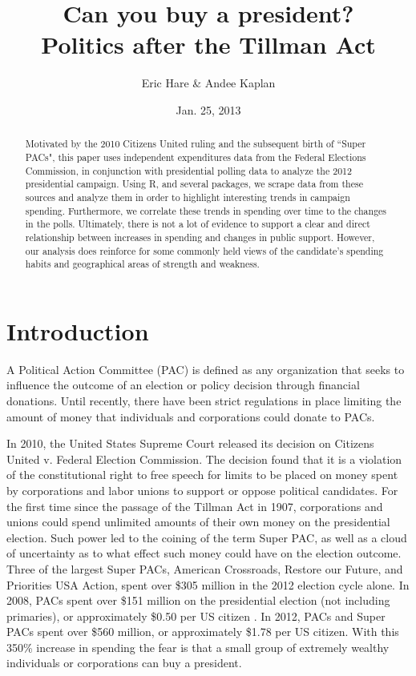 \documentclass[11pt]{article}\usepackage{graphicx, color}
\begin{document}
\setlength{\parskip}{3ex}
\setlength{\parindent}{0pt}

\title{Can you buy a president? \\ \vspace{.6cm} \Large Politics after the Tillman Act}
\author{Eric Hare \& Andee Kaplan}
\date{Jan. 25, 2013}

\maketitle
\thispagestyle{empty}
\begin{abstract}
Motivated by the 2010 Citizens United ruling and the subsequent birth of ``Super PACs", this paper uses independent expenditures data from the Federal Elections Commission, in conjunction with presidential polling data to analyze the 2012 presidential campaign. Using R, and several packages, we scrape data from these sources and analyze them in order to highlight interesting trends in campaign spending. Furthermore, we correlate these trends in spending over time to the changes in the polls. Ultimately, there is not a lot of evidence to support a clear and direct relationship between increases in spending and changes in public support. However, our analysis does reinforce for some commonly held views of the candidate's spending habits and geographical areas of strength and weakness.
\end{abstract}
\clearpage

\setcounter{page}{1}
\section{Introduction}

A Political Action Committee (PAC) is defined as any organization that seeks to influence the outcome of an election or policy decision through financial donations. Until recently, there have been strict regulations in place limiting the amount of money that individuals and corporations could donate to PACs.

In 2010, the United States Supreme Court released its decision on Citizens United v. Federal Election Commission. The decision found that it is a violation of the constitutional right to free speech for limits to be placed on money spent by corporations and labor unions to support or oppose political candidates. For the first time since the passage of the Tillman Act in 1907, corporations and unions could spend unlimited amounts of their own money on the presidential election. Such power led to the coining of the term Super PAC, as well as a cloud of uncertainty as to what effect such money could have on the election outcome. Three of the largest Super PACs, American Crossroads, Restore our Future, and Priorities USA Action, spent over \$305 million in the 2012 election cycle alone. In 2008, PACs spent over \$151 million on the presidential election (not including primaries), or approximately \$0.50 per US citizen \cite{fc-spend}. In 2012, PACs and Super PACs spent over \$560 million, or approximately \$1.78 per US citizen. With this 350\% increase in spending the fear is that a small group of extremely wealthy individuals or corporations can buy a president.
\end{document}
